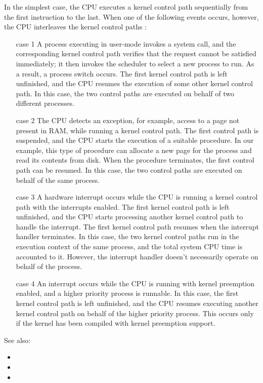 In the simplest case, the CPU executes a kernel control path sequentially from the first
instruction to the last. When one of the following events occurs, however, the CPU
interleaves the kernel control paths :
\begin{itemize}
\item[case 1] A process executing in user-mode invokes a system call, and the
  corresponding kernel control path verifies that the request cannot be satisfied
  immediately; it then invokes the scheduler to select a new process to run. As a result,
  a process switch occurs. The first kernel control path is left unfinished, and the CPU
  resumes the execution of some other kernel control path. In this case, the two control
  paths are executed on behalf of two different processes.
\item[case 2] The CPU detects an exception, for example, access to a page not present in
  RAM, while running a kernel control path. The first control path is suspended, and the
  CPU starts the execution of a suitable procedure. In our example, this type of procedure
  can allocate a new page for the process and read its contents from disk. When the
  procedure terminates, the first control path can be resumed. In this case, the two
  control paths are executed on behalf of the same process.
\item[case 3] A hardware interrupt occurs while the CPU is running a kernel control path
  with the interrupts enabled. The first kernel control path is left unfinished, and the
  CPU starts processing another kernel control path to handle the interrupt. The first
  kernel control path resumes when the interrupt handler terminates. In this case, the two
  kernel control paths run in the execution context of the same process, and the total
  system CPU time is accounted to it. However, the interrupt handler doesn't necessarily
  operate on behalf of the process.
\item[case 4] An interrupt occurs while the CPU is running with kernel preemption enabled,
  and a higher priority process is runnable. In this case, the first kernel control path
  is left unfinished, and the CPU resumes executing another kernel control path on behalf
  of the higher priority process. This occurs only if the kernel has been compiled with
  kernel preemption support.
\end{itemize}

See also:
\begin{itemize}
\item {}
\item {}
\item {}
\end{itemize}

